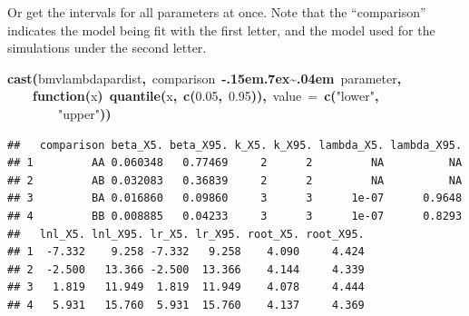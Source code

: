 \documentclass{elsarticle}
\makeatletter
\newcommand{\hlnumber}[1]{\textcolor[rgb]{0,0,0}{#1}}%
\newcommand{\hlfunctioncall}[1]{\textcolor[rgb]{.5,0,.33}{\textbf{#1}}}%
\newcommand{\hlstring}[1]{\textcolor[rgb]{.6,.6,1}{#1}}%
\newcommand{\hlkeyword}[1]{\textbf{#1}}%
\newcommand{\hlargument}[1]{\textcolor[rgb]{.69,.25,.02}{#1}}%
\newcommand{\hlformalargs}[1]{\hlargument{#1}}%
\newcommand{\hlsymbol}[1]{#1}%
\def\urltilda{\kern -.15em\lower .7ex\hbox{\~{}}\kern .04em}%
\newcommand{\hlstd}[1]{\textcolor[rgb]{0,0,0}{#1}}%
\newenvironment{kframe}{%
 \def\FrameCommand##1{\hskip\@totalleftmargin \hskip-\fboxsep
 \colorbox{shadecolor}{##1}\hskip-\fboxsep
     \hskip-\linewidth \hskip-\@totalleftmargin \hskip\columnwidth}%
 \MakeFramed {\advance\hsize-\width
   \@totalleftmargin\z@ \linewidth\hsize
   \@setminipage}}%
 {\par\unskip\endMakeFramed}
\newenvironment{knitrout}{}{} %
\makeatother
\begin{document}
Or get the intervals for all parameters at once. Note that the ``comparison'' indicates the model being fit with the first letter, and the model used for the simulations under the second letter. 
\begin{knitrout}
\color{fgcolor}\begin{kframe}
\begin{flushleft}
\ttfamily\noindent
\hlfunctioncall{cast}\hlkeyword{(}\hlsymbol{bm\usebox{\hlnormalsizeboxunderscore}v\usebox{\hlnormalsizeboxunderscore}lambda}\hlkeyword{\usebox{\hlnormalsizeboxdollar}}\hlsymbol{par\usebox{\hlnormalsizeboxunderscore}dist}\hlkeyword{,}{\ }\hlsymbol{comparison}{\ }\hlkeyword{\urltilda{}}{\ }\hlsymbol{parameter}\hlkeyword{,}\hspace*{\fill}\\
\hlstd{}{\ }{\ }{\ }{\ }\hlkeyword{function}\hlkeyword{(}\hlformalargs{x}\hlkeyword{)}{\ }\hlfunctioncall{quantile}\hlkeyword{(}\hlsymbol{x}\hlkeyword{,}{\ }\hlfunctioncall{c}\hlkeyword{(}\hlnumber{0.05}\hlkeyword{,}{\ }\hlnumber{0.95}\hlkeyword{)}\hlkeyword{)}\hlkeyword{,}{\ }\hlargument{value}{\ }\hlargument{=}{\ }\hlfunctioncall{c}\hlkeyword{(}\hlstring{"{}lower"{}}\hlkeyword{,}\hspace*{\fill}\\
\hlstd{}{\ }{\ }{\ }{\ }{\ }{\ }{\ }{\ }\hlstring{"{}upper"{}}\hlkeyword{)}\hlkeyword{)}\mbox{}
\normalfont
\end{flushleft}
\begin{verbatim}
##   comparison beta_X5. beta_X95. k_X5. k_X95. lambda_X5. lambda_X95.
## 1         AA 0.060348   0.77469     2      2         NA          NA
## 2         AB 0.032083   0.36839     2      2         NA          NA
## 3         BA 0.016860   0.09860     3      3      1e-07      0.9648
## 4         BB 0.008885   0.04233     3      3      1e-07      0.8293
##   lnl_X5. lnl_X95. lr_X5. lr_X95. root_X5. root_X95.
## 1  -7.332    9.258 -7.332   9.258    4.090     4.424
## 2  -2.500   13.366 -2.500  13.366    4.144     4.339
## 3   1.819   11.949  1.819  11.949    4.078     4.444
## 4   5.931   15.760  5.931  15.760    4.137     4.369
\end{verbatim}
\end{kframe}
\end{knitrout}
\end{document}
